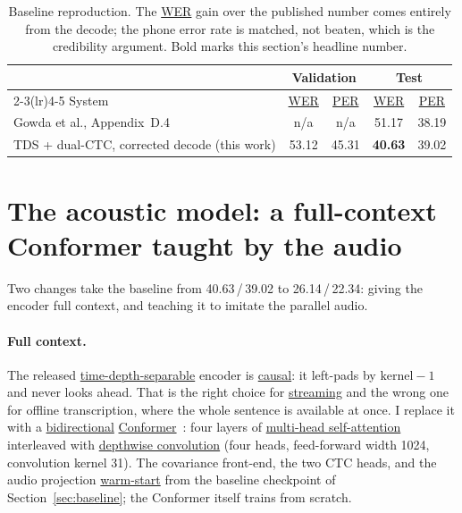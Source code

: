 \documentclass{article}
\DeclareRobustCommand{\glref}[2]{\hyperlink{gl:#1}{\textcolor{glosslink}{#2}}}
\DeclareRobustCommand{\wer}{\glref{wer}{WER}}
\DeclareRobustCommand{\per}{\glref{per}{PER}}
\begin{document}
\begin{table}[t]
\centering
\small
\caption{Baseline reproduction. The \wer{} gain over the published number comes entirely from the
decode; the phone error rate is matched, not beaten, which is the credibility argument. Bold marks
this section's headline number.}
\label{tab:baseline}
\begin{tabular}{@{}l cc cc@{}}
\toprule
 & \multicolumn{2}{c}{Validation} & \multicolumn{2}{c}{Test} \\
\cmidrule(lr){2-3}\cmidrule(lr){4-5}
System & \wer{} & \per{} & \wer{} & \per{} \\
\midrule
Gowda et al., Appendix~D.4~\citep{gowda2026emg2speech} & n/a & n/a & 51.17 & 38.19 \\
TDS + dual-CTC, corrected decode (this work) & 53.12 & 45.31 & \textbf{40.63} & 39.02 \\
\bottomrule
\end{tabular}
\end{table}

\section{The acoustic model: a full-context Conformer taught by the audio}
\label{sec:acoustic}

Two changes take the baseline from 40.63\,/\,39.02 to 26.14\,/\,22.34: giving the encoder full
context, and teaching it to imitate the parallel audio.

\paragraph{Full context.}
The released \glref{tds}{time-depth-separable} encoder is \glref{causal}{causal}: it left-pads by
$\text{kernel}-1$ and never looks ahead. That is the right choice for \glref{streaming}{streaming} and
the wrong one for offline transcription, where the whole sentence is available at once. I replace it
with a \glref{bidir}{bidirectional} \glref{conformer}{Conformer}~\citep{gulati2020conformer}: four
layers of \glref{attention}{multi-head self-attention} interleaved with
\glref{depthwise}{depthwise convolution} (four heads, feed-forward width 1024, convolution kernel 31).
The covariance front-end, the two CTC heads, and the audio projection
\glref{warmstart}{warm-start} from the baseline checkpoint of Section~\ref{sec:baseline}; the
Conformer itself trains from scratch.
\end{document}
